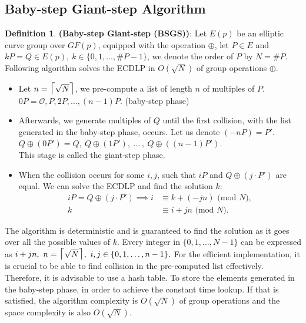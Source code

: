 \documentclass[thesis=M,english]{FITthesis}[2012/10/20]
\theoremstyle{remark}
\theoremstyle{definition}
\newtheorem{DF}{Definition}[section]
\begin{document}
\subsection{Baby-step Giant-step Algorithm}
\begin{DF}
\textbf{(Baby-step Giant-step (BSGS))}: Let $E(p)$ be an elliptic curve group over $GF(p)$, equipped with the operation $\oplus$, let $P \in E$ and $kP = Q \in E(p),\ k \in \{0, 1, \ldots, \#P - 1\}$, we denote the order of $P$ by $N = \#P$. Following algorithm solves the ECDLP in $O(\sqrt{N})$ of group operations $\oplus$.
\begin{itemize}
\item Let $n = \mathlarger{\mathlarger{\mathlarger{\lceil}}} \sqrt{N} \mathlarger{\mathlarger{\mathlarger{\rceil}}}$, we pre-compute a list of length $n$ of multiples of $P$. \\
$0P = \mathcal{O}, P, 2P, \ldots, (n-1)P.$ \hfill (baby-step phase) \\
\item Afterwards, we generate multiples of $Q$ until the first collision, with the list generated in the baby-step phase, occurs. Let us denote $(-n P) = P'$. \\
$Q \oplus (0P') = Q,\ Q \oplus (1P'),\ \ldots\ ,\ Q \oplus ((n-1)P').$\\
This stage is called the giant-step phase.
\item When the collision occurs for some $i,j$, such that $iP$ and $Q \oplus (j\cdot P')$ are equal. We can solve the ECDLP and find the solution $k$:
\begin{align*}
iP = Q \oplus (j\cdot P') \implies i &\equiv k + (-jn) \text{ (mod $N$)}, \\
k &\equiv i + jn \text{ (mod $N$)}.
\end{align*}
\end{itemize}
\noindent The algorithm is deterministic and is guaranteed to find the solution as it goes over all the possible values of $k$. Every integer in $\{0, 1, \ldots, N - 1\}$ can be expressed as $i + jn,\ n = \mathlarger{\mathlarger{\mathlarger{\lceil}}} \sqrt{N} \mathlarger{\mathlarger{\mathlarger{\rceil}}},\ i,j \in \{0,1,\ldots, n-1\}.$ 
For the efficient implementation, it is crucial to be able to find collision in the pre-computed list effectively. Therefore, it is advisable to use a hash table. To store the elements generated in the baby-step phase, in order to achieve the constant time lookup. If that is satisfied, the algorithm complexity is $O(\sqrt{N})$ of group operations and the space complexity is also $O(\sqrt{N})$.
\end{DF}
\end{document}
